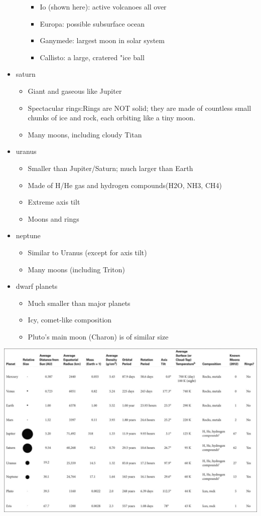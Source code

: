 \documentclass[12pt]{article}
\begin{document}
\begin{itemize}
\begin{itemize}
\begin{itemize}
\item Io (shown here): active volcanoes all over
\item Europa: possible subsurface ocean
\item Ganymede: largest moon in solar system
\item Callisto: a large, cratered "ice ball
\end{itemize}
\end{itemize}
\item saturn
\begin{itemize}
\item Giant and gaseous like Jupiter
\item Spectacular rings:Rings are NOT solid; they are made of countless small chunks of ice and rock, each orbiting like a tiny moon.
\item Many moons, including cloudy Titan
\end{itemize}
\item uranus
\begin{itemize}
\item Smaller than Jupiter/Saturn; much larger than Earth
\item Made of H/He gas and hydrogen compounds(H2O, NH3, CH4)
\item Extreme axis tilt
\item Moons and rings
\end{itemize}
\item neptune
\begin{itemize}
\item Similar to Uranus (except for axis tilt)
\item Many moons (including Triton)
\end{itemize}
\item dwarf planets
\begin{itemize}
\item Much smaller than major planets
\item Icy, comet-like composition
\item Pluto's main moon (Charon) is of similar size
\end{itemize}
\end{itemize}
\includegraphics[angle=90,scale=0.5]{planetData}
\end{document}
